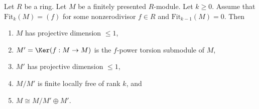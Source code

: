 \begin{lemma}
\label{lemma-fitting-ideals-and-pd1}
Let $R$ be a ring. Let $M$ be a finitely presented $R$-module. Let $k \geq 0$.
Assume that $\text{Fit}_k(M) = (f)$ for some nonzerodivisor $f \in R$
and $\text{Fit}_{k - 1}(M) = 0$. Then
\begin{enumerate}
\item $M$ has projective dimension $\leq 1$,
\item $M' = \Ker(f : M \to M)$ is the $f$-power torsion submodule of $M$,
\item $M'$ has projective dimension $\leq 1$,
\item $M/M'$ is finite locally free of rank $k$, and
\item $M \cong M/M' \oplus M'$.
\end{enumerate}
\end{lemma}

